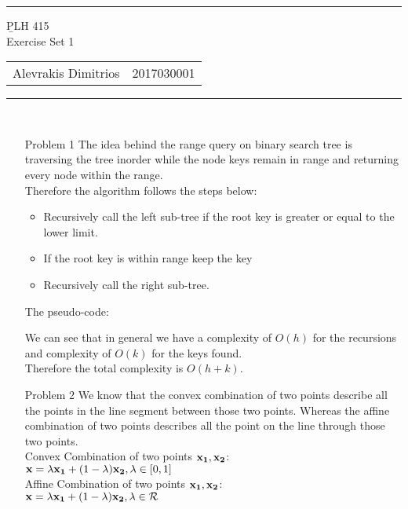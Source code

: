 \documentclass[11pt]{article}
\begin{document}
	\noindent\rule{\textwidth}{2pt}
	\begin{center}
		{\b PLH 415} \\
		Exercise Set 1\\
		\begin{tabular}{ c c }
			Alevrakis Dimitrios & 2017030001
		\end{tabular}
	\end{center}
	\rule{\textwidth}{.5pt}%
	\\
	\noindent
	\begin{enumerate}
		\item [Problem 1]
		The idea behind the range query on binary search tree is traversing the tree inorder while the node keys remain in range and returning every node within the range.\\
		Therefore the algorithm follows the steps below:\\
		\begin{itemize}
			\item Recursively call the left sub-tree if the root key is greater or equal to the lower limit.
			\item If the root key is within range keep the key
			\item Recursively call the right sub-tree.
		\end{itemize} 
		The pseudo-code:
		
		
		We can see that in general we have a complexity of $O(h)$ for the recursions and complexity of $O(k)$ for the keys found.\\
		Therefore the total complexity is $O(h+k)$.
		
		\newpage
		\item[Problem 2]
		We know that the convex combination of two points describe all the points in the line segment between those two points. Whereas the affine combination of two points describes all the point on the line through those two points.\\
		
		Convex Combination of two points ${\bf x_1},{\bf x_2}$:\\
		$\displaystyle {\bf x}=\lambda{\bf x_1} + (1-\lambda){\bf x_2},\lambda\in[0,1]$\\
		
		Affine Combination of two points ${\bf x_1},{\bf x_2}$:\\
		$\displaystyle {\bf x}=\lambda{\bf x_1} + (1-\lambda){\bf x_2},\lambda\in \mathcal{R}$\\
		

\end{enumerate}
\end{document}
